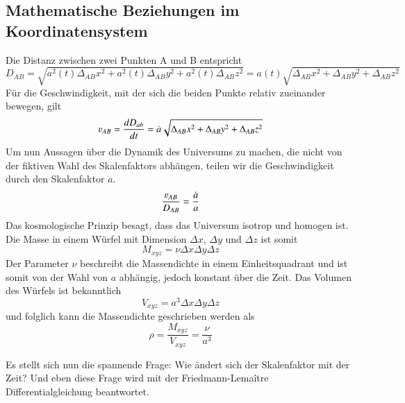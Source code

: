 \begin{refsection}
\subsection{Mathematische Beziehungen im Koordinatensystem}
Die Distanz zwischen zwei Punkten A und B entspricht 
\begin{equation}
D_{AB} = \sqrt{a^2(t)\Delta_{AB}x^2 + a^2(t)\Delta_{AB}y^2 + a^2(t)\Delta_{AB}z^2} = a(t) \sqrt{\Delta_{AB}x^2 + \Delta_{AB}y^2 + \Delta_{AB}z^2}
\end{equation}
F\"{u}r die Geschwindigkeit, mit der sich die beiden Punkte relativ zueinander bewegen, gilt 
\begin{equation}
\varv_{AB} = \dfrac{dD_{ab}}{dt} 
= \dot{a} \sqrt{\Delta_{AB}x^2 + \Delta_{AB}y^2 + \Delta_{AB}z^2}
\end{equation}
Um nun Aussagen über die Dynamik des Universums zu machen, die nicht von der fiktiven Wahl des Skalenfaktors abhängen, teilen wir die Geschwindigkeit durch den Skalenfaktor $a$.
\begin{equation}
\frac{\varv_{AB} }{D_{AB}} = \frac{\dot{a}}{a}
\label{friedmann:geschwindigkeit}
\end{equation}
Das kosmologische Prinzip besagt, dass das Universum isotrop und homogen ist. Die Masse in einem Würfel mit Dimension $\Delta x$, $\Delta y$ und $\Delta z$ ist somit
\begin{equation}
M_{xyz} = \nu \Delta x \Delta y \Delta z
\end{equation}
Der Parameter $\nu$ beschreibt die Massendichte in einem Einheitsquadrant und ist somit von der Wahl von $a$ abhängig, jedoch konstant über die Zeit. Das Volumen des Würfels ist bekanntlich 
\begin{equation}
V_{xyz} = a^3 \Delta x \Delta y \Delta z
\end{equation}
und folglich kann die Massendichte geschrieben werden als
\begin{equation}
\rho = \frac{M_{xyz}}{V_{xyz}} = \frac{\nu}{a^3}
\label{friedmann:dichte}
\end{equation}

Es stellt sich nun die spannende Frage: Wie ändert sich der Skalenfaktor mit der Zeit? Und eben diese Frage wird mit der Friedmann-Lema\^{i}tre Differentialgleichung beantwortet.



\end{refsection}
